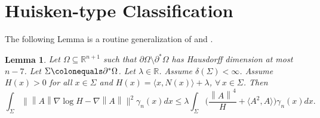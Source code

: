 \documentclass[12pt,reqno]{amsart}
\newtheorem{lemma}[theorem]{Lemma}
\theoremstyle{definition}
\renewcommand{\subset}{\subseteq}
\newcommand{\vnormt}[1]{\left\|#1\right\|}    %
\newcommand{\R}{\mathbb{R}}
\newcommand{\redA}{\partial^{*}\Omega}
\newcommand{\sdimn}{n}
\newcommand{\adimn}{n+1}
\newcommand{\scon}{\lambda}
\newcommand{\pcon}{\delta}
\begin{document}
\section{Huisken-type Classification}\label{secdif}

The following Lemma is a routine generalization of \cite[Lemma 10.14]{colding12a} and  \cite[Lemma 7.3]{zhu16}.
\begin{lemma}\label{lemma37}
Let $\Omega\subset\R^{\adimn}$ such that $\partial\Omega\setminus\redA$ has Hausdorff dimension at most $\sdimn-7$.  Let $\Sigma\colonequals\redA$.  Let $\scon\in\R$.  Assume $\pcon(\Sigma)<\infty$.  Assume $H(x)>0$ for all $x\in\Sigma$ and $H(x)=\langle x,N(x)\rangle+\scon$, $\forall\,x\in\Sigma$.  Then
$$\int_{\Sigma}\Big\|\vnormt{A}\nabla \log H -\nabla\vnormt{A}\Big\|^{2}\gamma_{\sdimn}(x)dx
\leq \scon\int_{\Sigma}\Big(\frac{\vnormt{A}^{4}}{H}+\langle A^{2},A\rangle\Big)\gamma_{\sdimn}(x)dx.$$
\end{lemma}
\end{document}
